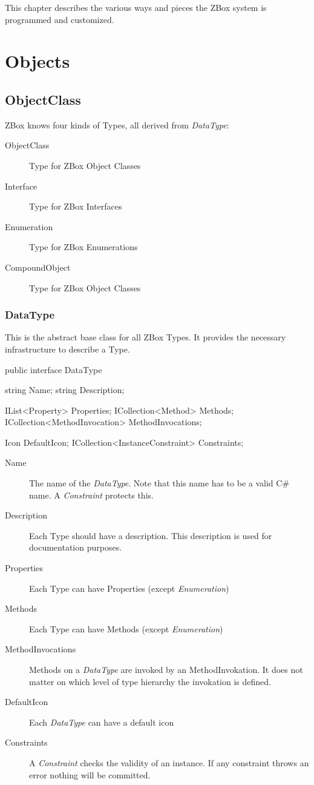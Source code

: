 This chapter describes the various ways and pieces the ZBox system is
programmed and customized.

\section{Objects}

\subsection{ObjectClass}

ZBox knows four kinds of Types, all derived from \emph{DataType}:
\begin{description}
\item[ObjectClass] { Type for ZBox Object Classes }
\item[Interface] { Type for ZBox Interfaces }
\item[Enumeration] { Type for ZBox Enumerations }
\item[CompoundObject] { Type for ZBox Object Classes }
\end{description}

\subsubsection{DataType}
This is the abstract base class for all ZBox Types. It provides the necessary
infrastructure to describe a Type.

\begin{CS}
public interface DataType 
{
    string Name;
    string Description;

    IList<Property> Properties;
    ICollection<Method> Methods;
    ICollection<MethodInvocation> MethodInvocations;

    Icon DefaultIcon;
    ICollection<InstanceConstraint> Constraints;
}
\end{CS}

\begin{description}
\item[Name] { The name of the \emph{DataType}. Note that this name has to be a
valid C\# name. A \emph{Constraint} protects this. }
\item[Description] { Each Type should have a description. This description is
used for documentation purposes. }
\item[Properties] { Each Type can have Properties (except \emph{Enumeration})}
\item[Methods] { Each Type can have Methods (except \emph{Enumeration})}
\item[MethodInvocations] { Methods on a \emph{DataType} are invoked by an
MethodInvokation. It does not matter on which level of type hierarchy the
invokation is defined. }
\item[DefaultIcon] { Each \emph{DataType} can have a default icon}
\item[Constraints] { A \emph{Constraint} checks the validity of an instance. If
any constraint throws an error nothing will be committed. }
\end{description}

